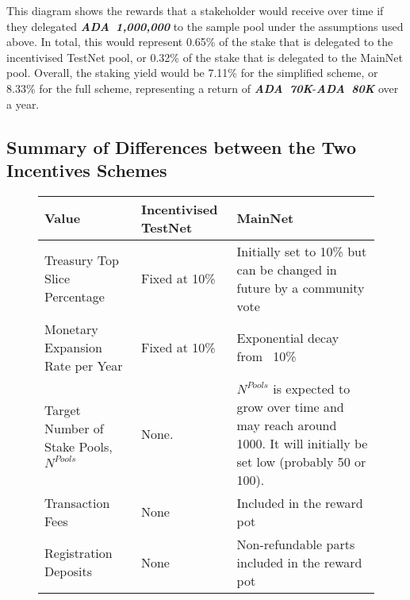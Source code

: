 \documentclass[11pt,a4paper,dvipsnames,twosided,final]{article}
\newcommand{\ada}{ADA{}}
\newcommand{\ADA}[1]{\textbf{\emph{\ada~{#1}}}}
\begin{document}
\noindent
This diagram shows the rewards that a stakeholder would receive over time if they delegated \ADA{1,000,000} to
the sample pool under the assumptions used above.  In total, this would represent 0.65\% of the stake
that is delegated to the incentivised TestNet pool, or 0.32\% of the stake that is delegated to the MainNet pool.
Overall, the staking yield would be 7.11\% for the simplified scheme, or 8.33\% for the full scheme, representing
a return of \ADA{70K}-\ADA{80K} over a year.

\clearpage
\subsection{Summary of Differences between the Two Incentives Schemes}
\label{sec:summary}

\begin{figure}[h!]
\begin{center}
\begin{tabular}{||l|p{4cm}|p{4cm}||}
  \hline\hline
  \textbf{Value} & \textbf{Incentivised TestNet} & \textbf{MainNet}
                                              \\\hline
Treasury Top Slice Percentage
& Fixed at 10\%
& Initially set to 10\% but can be changed in future by a community vote
                                              \\\hline
Monetary Expansion Rate per Year
& Fixed at 10\%
& Exponential decay from ~10\%
                                              \\\hline
 Target Number of Stake Pools, $N^{\textit{Pools}}$
                 &
                   None.
                   &
$N^{\textit{Pools}}$ is expected to grow over time and may reach around 1000.
                     It will initially be set low (probably 50 or 100). %
  \\\hline
Transaction Fees
& None
& Included in the reward pot
                                              \\\hline
Registration Deposits
& None
& Non-refundable parts included in the reward pot
                                              \\\hline

\end{tabular}
\end{center}
\end{figure}
\end{document}
